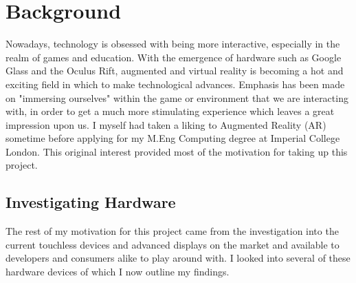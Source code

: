 \documentclass[11pt]{report}
\begin{document}
\newpage
\section*{Background}
Nowadays, technology is obsessed with being more interactive, especially in 
the realm of games and education. With the emergence of hardware such as
Google Glass and the Oculus Rift, augmented and virtual reality is becoming
a hot and exciting field in which to make technological advances. Emphasis
has been made on "immersing ourselves" within the game or environment that
we are interacting with, in order to get a much more stimulating experience
which leaves a great impression upon us. I myself had taken a liking to 
Augmented Reality (AR) sometime before applying for my M.Eng Computing degree
at Imperial College London. This original interest provided most of the 
motivation for taking up this project.

\subsection*{Investigating Hardware}
The rest of my motivation for this project came from the investigation into 
the current touchless devices and advanced displays on the market and 
available to developers and consumers alike to play around with. I looked 
into several of these hardware devices of which I now outline my findings.
 
\end{document}
